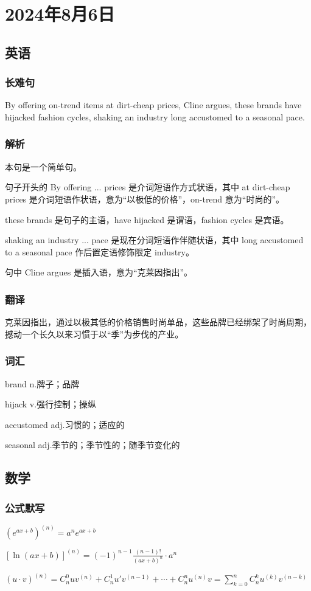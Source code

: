 \documentclass[UTF8]{ctexart}
\begin{document}
\section{2024年8月6日}
\subsection{英语}
\subsubsection{长难句}
By offering on-trend items at dirt-cheap prices, Cline argues, these brands have hijacked fashion cycles, shaking an industry long accustomed to a seasonal pace.
\subsubsection{解析}
本句是一个简单句。

句子开头的 By offering ... prices 是介词短语作方式状语，其中 at dirt-cheap prices 是介词短语作状语，意为“以极低的价格”，on-trend 意为“时尚的”。

these brands 是句子的主语，have hijacked 是谓语，fashion cycles 是宾语。

shaking an industry ... pace 是现在分词短语作伴随状语，其中 long accustomed to a seasonal pace 作后置定语修饰限定 industry。

句中 Cline argues 是插入语，意为“克莱因指出”。
\subsubsection{翻译}
克莱因指出，通过以极其低的价格销售时尚单品，这些品牌已经绑架了时尚周期，撼动一个长久以来习惯于以“季”为步伐的产业。
\subsubsection{词汇}
brand n.牌子；品牌

hijack v.强行控制；操纵

accustomed adj.习惯的；适应的

seasonal adj.季节的；季节性的；随季节变化的
\subsection{数学}
\subsubsection{公式默写}
\begin{multicols}{2}
      $(e^{ax+b})^{(n)}=a^ne^{ax+b}$

      $[\ln(ax+b)]^{(n)}=(-1)^{n-1}\frac{(n-1)!}{(ax+b)^n}\cdot a^n$
\end{multicols}
$(u\cdot v)^{(n)}=C_n^0uv^{(n)}+C_n^1u'v^{(n-1)}+\cdots+C_n^nu^{(n)}v=\sum\limits_{k=0}^{n}C_n^ku^{(k)}v^{(n-k)}$
\end{document}
